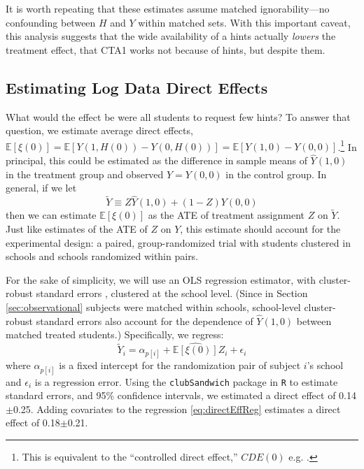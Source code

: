 \documentclass{article}\usepackage[]{graphicx}\usepackage[]{color}
\newcommand{\EE}{\mathbb{E}}
\begin{document}
It is worth repeating that these estimates assume matched ignorability---no confounding between
$H$ and $Y$ within matched sets.
With this important caveat, this analysis suggests that the
wide availability of a hints
actually \emph{lowers} the treatment effect, that CTA1 works not
because of hints, but despite them.

\subsection{Estimating Log Data Direct Effects}\label{sec:directEst}

What would the effect be were all students to request few hints?
To answer that question, we estimate average direct effects,
$\EE[\xi(0)]=\EE[Y(1,H(0))-Y(0,H(0))]=\EE[Y(1,0)-Y(0,0)]$.\footnote{This
  is equivalent to the ``controlled direct effect,'' $CDE(0)$
  e.g. \citet[][p. 57]{vanderweele2015explanation}.}
In principal, this could be estimated as the difference in sample
means of $\hat{Y}(1,0)$ in the treatment group and observed $Y=Y(0,0)$
in the control group.
In general, if we let
\begin{equation*}
\tilde{Y}\equiv Z\hat{Y}(1,0)+(1-Z)Y(0,0)
\end{equation*}
then we can estimate $\EE[\xi(0)]$ as the ATE of treatment assignment
$Z$ on $\tilde{Y}$.
Just like estimates of the ATE of $Z$ on $Y$, this estimate should
account for the experimental design: a paired, group-randomized trial
with students clustered in schools and schools randomized within
pairs.

For the sake of simplicity, we will use an OLS regression estimator,
with cluster-robust standard errors \citep{pustejovsky2018small},
clustered at the school level.
(Since in Section \ref{sec:observational} subjects were matched
within schools, school-level cluster-robust standard errors also account for the
dependence of $\hat{Y}(1,0)$ between matched treated students.)
Specifically, we regress:
\begin{equation}\label{eq:directEffReg}
\tilde{Y}_i=\alpha_{p[i]}+\widehat{\EE[\xi(0)]}Z_i+\epsilon_i
\end{equation}
where $\alpha_{p[i]}$ is a fixed intercept for the randomization pair
of subject $i$'s school and $\epsilon_i$ is a regression error.
Using the \texttt{clubSandwich} package in \texttt{R}
\citep{clubsandwich} to estimate standard errors, and 95\% confidence intervals, we estimated a direct
effect of
0.14$\pm$0.25.
Adding covariates to the regression \eqref{eq:directEffReg} estimates a direct effect of
0.18$\pm$0.21.
\end{document}
